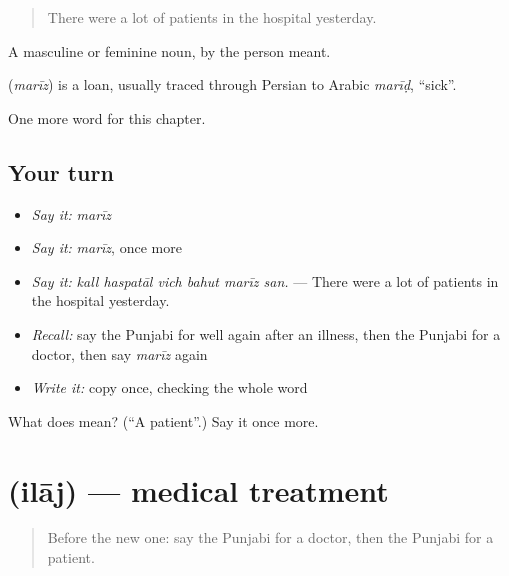 \begin{quote}
There were a lot of patients in the hospital yesterday.
\end{quote}

A masculine or feminine noun, by the person meant.

\begin{cousinweb}
\textbf{} (\emph{marīz}) is a loan, usually traced through Persian to Arabic \emph{marīḍ}, \textquotedblleft{}sick\textquotedblright{}.
\end{cousinweb}

\begin{grammarlens}[title={What you've built}]
One more word for this chapter.
\end{grammarlens}

\subsection*{Your turn}
\begin{itemize}
\raggedright
  \item \emph{Say it:} \emph{marīz}
  \item \emph{Say it:} \emph{marīz}, once more
  \item \emph{Say it:} \emph{kall haspatāl vich bahut marīz san.} — There were a lot of patients in the hospital yesterday.
  \item \emph{Recall:} say the Punjabi for well again after an illness, then the Punjabi for a doctor, then say \emph{marīz} again
  \item \emph{Write it:} copy \textbf{} once, checking the whole word
\end{itemize}

\begin{tcolorbox}[breakable,colback=teal!4,colframe=teal!35!black,title={Before you move on}]
What does  mean? (\textquotedblleft{}A patient\textquotedblright{}.) Say it once more.
\end{tcolorbox}
\section[\texorpdfstring{\pa{ਇਲਾਜ} (ilāj)}{ਇਲਾਜ (ilāj)}]{ (ilāj) — medical treatment}

\label{lesson:PA-C320-ilaj}



\begin{quote}
Before the new one: say the Punjabi for a doctor, then the Punjabi for a patient.
\end{quote}

